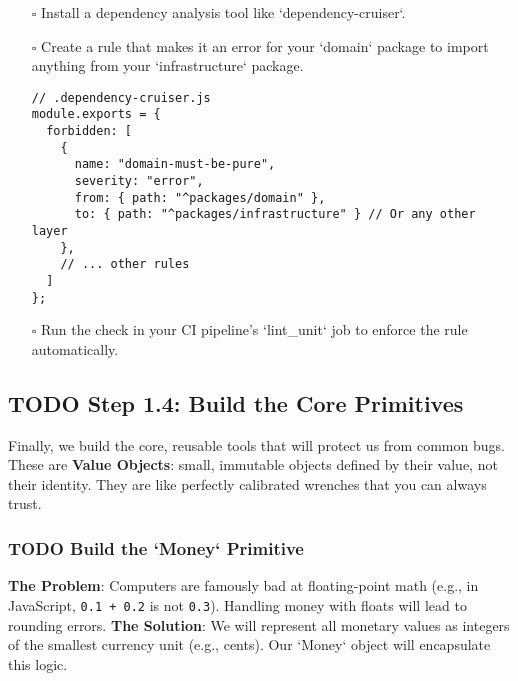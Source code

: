 \documentclass[11pt]{article}
\begin{document}
\begin{itemize}
\item[{$\square$}] Install a dependency analysis tool like `dependency-cruiser`.
\item[{$\square$}] Create a rule that makes it an error for your `domain` package to import anything from your `infrastructure` package.
\begin{verbatim}
// .dependency-cruiser.js
module.exports = {
  forbidden: [
    {
      name: "domain-must-be-pure",
      severity: "error",
      from: { path: "^packages/domain" },
      to: { path: "^packages/infrastructure" } // Or any other layer
    },
    // ... other rules
  ]
};
\end{verbatim}
\item[{$\square$}] Run the check in your CI pipeline's `lint\_unit` job to enforce the rule automatically.
\end{itemize}
\subsection{{\bfseries\sffamily TODO} Step 1.4: Build the Core Primitives}
\label{sec:org9be5daa}
Finally, we build the core, reusable tools that will protect us from common bugs. These are \textbf{Value Objects}: small, immutable objects defined by their value, not their identity. They are like perfectly calibrated wrenches that you can always trust.
\subsubsection{{\bfseries\sffamily TODO} Build the `Money` Primitive}
\label{sec:org868ce5e}
\textbf{The Problem}: Computers are famously bad at floating-point math (e.g., in JavaScript, \texttt{0.1 + 0.2} is not \texttt{0.3}). Handling money with floats will lead to rounding errors.
\textbf{The Solution}: We will represent all monetary values as integers of the smallest currency unit (e.g., cents). Our `Money` object will encapsulate this logic.
\end{document}
